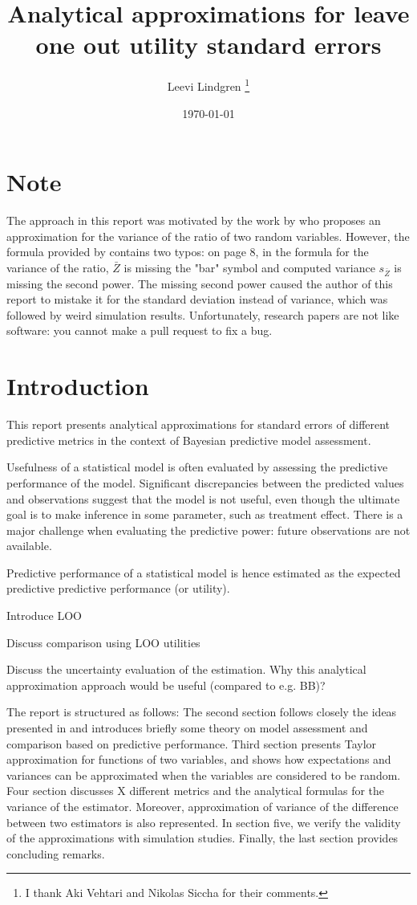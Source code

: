 \documentclass{article}
\title{Analytical approximations for leave one out utility standard errors}
\author{Leevi Lindgren \footnote{I thank Aki Vehtari and Nikolas Siccha for their comments.}}
\date{\today}
\begin{document}
\maketitle

\clearpage
\section*{Note}

The approach in this report was motivated by the work by \cite{hastings1970monte} who proposes an approximation for the variance of the ratio of two random variables. However, the formula provided by \cite{hastings1970monte} contains two typos: on page 8, in the formula for the variance of the ratio, $\bar{Z}$ is missing the "bar" symbol and computed variance $s_{\bar{Z}}$ is missing the second power. The missing second power caused the author of this report to mistake it for the standard deviation instead of variance, which was followed by weird simulation results. Unfortunately, research papers are not like software: you cannot make a pull request to fix a bug.
\clearpage

\tableofcontents
\clearpage
\section{Introduction}

This report presents analytical approximations for standard errors of different predictive metrics in the context of Bayesian predictive model assessment. 

Usefulness of a statistical model is often evaluated by assessing the predictive performance of the model. Significant discrepancies between the predicted values and observations suggest that the model is not useful, even though the ultimate goal is to make inference in some parameter, such as treatment effect. There is a major challenge when evaluating the predictive power: future observations are not available.

Predictive performance of a statistical model is hence estimated as the expected predictive predictive performance (or utility). 

Introduce LOO

Discuss comparison using LOO utilities

Discuss the uncertainty evaluation of the estimation. Why this analytical approximation approach would be useful (compared to e.g. BB)?

The report is structured as follows: The second section follows closely the ideas presented in \cite{vehtari_survey_2012} and introduces briefly some theory on model assessment and comparison based on predictive performance. Third section presents Taylor approximation for functions of two variables, and shows how expectations and variances can be approximated when the variables are considered to be random. Four section discusses X different metrics and the analytical formulas for the variance of the estimator. Moreover, approximation of variance of the difference between two estimators is also represented. In section five, we verify the validity of the approximations with simulation studies. Finally, the last section provides concluding remarks.
\end{document}
